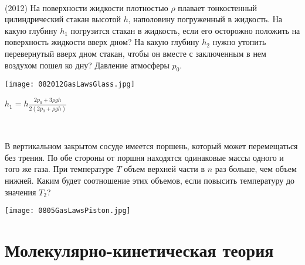 \begin{ex}
\hspace{0pt} \\
\begin{minipage}{.65\textwidth}
(2012) На поверхности жидкости плотностью $\rho$ плавает тонкостенный цилиндрический стакан высотой $h$, наполовину погруженный в жидкость. 
На какую глубину $h_1$ погрузится стакан в жидкость, если его осторожно положить на поверхность жидкости вверх дном? 
На какую глубину $h_2$ нужно утопить перевернутый вверх дном стакан, чтобы он вместе с заключенным в нем воздухом пошел ко дну? Давление атмосферы $p_0$.
\end{minipage}
\begin{minipage}{.35\textwidth}
\centering
\texttt{[image: 082012GasLawsGlass.jpg]}
\end{minipage}
\begin{ans}
$h_1 = h \frac{2p_0+3\rho gh}{2(2p_0 + \rho gh)}$
\end{ans}
\end{ex}

\begin{ex}
\hspace{0pt} \\
\begin{minipage}{.65\textwidth}
В вертикальном закрытом сосуде имеется поршень, который может перемещаться без трения. 
По обе стороны от поршня находятся одинаковые массы одного и того же газа. 
При температуре $T$ объем верхней части в $n$ раз больше, чем объем нижней. 
Каким будет соотношение этих объемов, если повысить температуру до значения $T_2$?
\end{minipage}
\begin{minipage}{.35\textwidth}
\centering
\texttt{[image: 0805GasLawsPiston.jpg]}
\end{minipage}
\begin{ans}
\end{ans}
\end{ex}

\section{Молекулярно-кинетическая теория}

